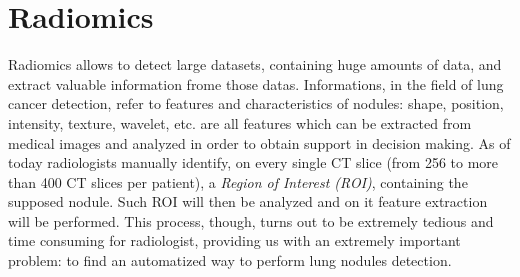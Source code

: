 \documentclass[../main.tex]{subfiles}
\begin{document}
\section{Radiomics}
Radiomics allows to detect large datasets, containing huge amounts of data, and extract valuable information frome those datas. Informations, in the field of lung cancer detection, refer to features and characteristics of nodules: shape, position, intensity, texture, wavelet, etc. are all features which can be extracted from medical images and analyzed in order to obtain support in decision making. \cite{Chen2017} As of today radiologists manually identify, on every single CT slice (from 256 to more than 400 CT slices per patient), a \textit{Region of Interest (ROI)}, containing the supposed nodule. Such ROI will then be analyzed and on it feature extraction will be performed. This process, though, turns out to be extremely tedious and time consuming for radiologist, providing us with an extremely important problem: to find an automatized way to perform lung nodules detection. 
\end{document}
